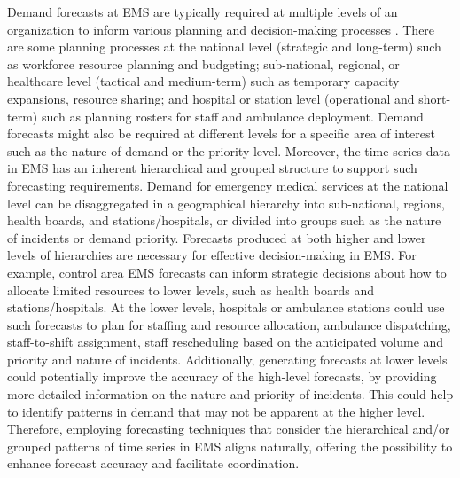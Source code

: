 \documentclass[
  authoryear,
  preprint,
  3p]{elsarticle}
\begin{document}
Demand forecasts at EMS are typically required at multiple levels of an
organization to inform various planning and decision-making processes
\citep{hulshof2012taxonomic}. There are some planning processes at the
national level (strategic and long-term) such as workforce resource
planning and budgeting; sub-national, regional, or healthcare level
(tactical and medium-term) such as temporary capacity expansions,
resource sharing; and hospital or station level (operational and
short-term) such as planning rosters for staff and ambulance deployment.
Demand forecasts might also be required at different levels for a
specific area of interest such as the nature of demand or the priority
level. Moreover, the time series data in EMS has an inherent
hierarchical and grouped structure to support such forecasting
requirements. Demand for emergency medical services at the national
level can be disaggregated in a geographical hierarchy into
sub-national, regions, health boards, and stations/hospitals, or divided
into groups such as the nature of incidents or demand priority.
Forecasts produced at both higher and lower levels of hierarchies are
necessary for effective decision-making in EMS. For example, control
area EMS forecasts can inform strategic decisions about how to allocate
limited resources to lower levels, such as health boards and
stations/hospitals. At the lower levels, hospitals or ambulance stations
could use such forecasts to plan for staffing and resource allocation,
ambulance dispatching, staff-to-shift assignment, staff rescheduling
based on the anticipated volume and priority and nature of incidents.
Additionally, generating forecasts at lower levels could potentially
improve the accuracy of the high-level forecasts, by providing more
detailed information on the nature and priority of incidents. This could
help to identify patterns in demand that may not be apparent at the
higher level. Therefore, employing forecasting techniques that consider
the hierarchical and/or grouped patterns of time series in EMS aligns
naturally, offering the possibility to enhance forecast accuracy and
facilitate coordination.
\end{document}
